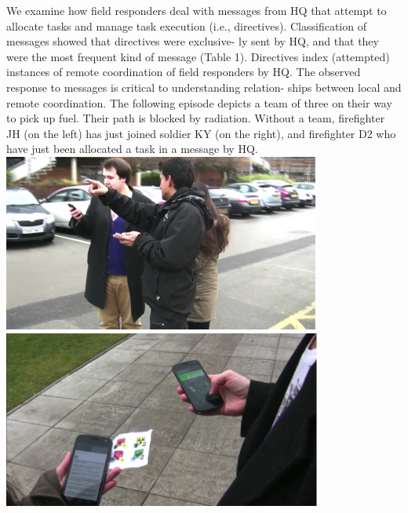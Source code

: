 We examine how field responders deal with messages from HQ that attempt to allocate tasks and manage task execution (i.e., directives). Classification of messages showed that directives were exclusive- ly sent by HQ, and that they were the most frequent kind of message (Table 1). Directives index (attempted) instances of remote coordination of field responders by HQ. The observed response to messages is critical to understanding relation- ships between local and remote coordination. The following episode depicts a team of three on their way to pick up fuel. Their path is blocked by radiation. Without a team, firefighter JH (on the left) has just joined soldier KY (on the right), and firefighter D2 who have just been allocated a task in a message by HQ.\\
\includegraphics[width=.5\textwidth]{img/study1/ep1/ep11}
\hfill \break
\noindent{}
\includegraphics[width=.5\textwidth]{img/study1/ep1/ep12}
\hfill \break
